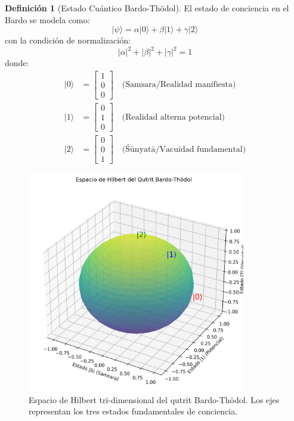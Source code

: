 \documentclass[12pt,a4paper]{article}
\newcommand{\ket}[1]{| #1 \rangle}
\theoremstyle{definition}
\newtheorem{definition}{Definición}[section]
\begin{document}
\begin{definition}[Estado Cuántico Bardo-Thödol]
El estado de conciencia en el Bardo se modela como:
\begin{equation}
\ket{\psi} = \alpha\ket{0} + \beta\ket{1} + \gamma\ket{2}
\end{equation}
con la condición de normalización:
\begin{equation}
|\alpha|^2 + |\beta|^2 + |\gamma|^2 = 1
\end{equation}
donde:
\begin{align*}
\ket{0} &= \begin{bmatrix}1\\0\\0\end{bmatrix} \quad\text{(Samsara/Realidad manifiesta)} \\
\ket{1} &= \begin{bmatrix}0\\1\\0\end{bmatrix} \quad\text{(Realidad alterna potencial)} \\
\ket{2} &= \begin{bmatrix}0\\0\\1\end{bmatrix} \quad\text{(Śūnyatā/Vacuidad fundamental)}
\end{align*}
\end{definition}

\begin{figure}[htbp]
\centering
\includegraphics[width=0.85\textwidth]{graphics/generated/qutrit_space.png}
\caption{Espacio de Hilbert tri-dimensional del qutrit Bardo-Thödol. Los ejes representan los tres estados fundamentales de conciencia.}
\label{fig:qutrit_space}
\end{figure}
\end{document}
